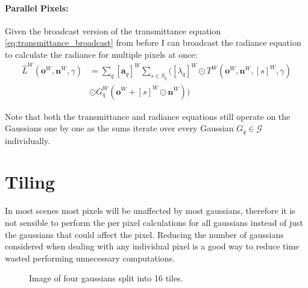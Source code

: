 \documentclass[a4paper, 11pt]{memoir}
\begin{document}
    \paragraph{Parallel Pixels:}
    \label{par:parallel_pixels}
    Given the broadcast version of the \gls{transmittance} equation \eqref{eq:transmittance_broadcast} from before I can broadcast the \gls{radiance} equation to
    calculate the \gls{radiance} for multiple pixels at once:
    \begin{equation}
        \begin{aligned}
            \hat{L}^W(\mathbf{o}^W, \mathbf{n}^W, \gamma) &= \sum_q [ \mathbf{a}_q ]^W \sum_{s \in S_q} \Big(
            [ \lambda_q ]^W \odot T^W(\mathbf{o}^W, \mathbf{n}^W, [ s ]^W, \gamma)\\
            &\odot G_q^W(\mathbf{o}^W + [ s ]^W \odot \mathbf{n}^W) \Big)
        \end{aligned}
        \label{eq:radiance_parallel_pixels}
    \end{equation}

    Note that both the \gls{transmittance} and \gls{radiance} equations still operate on the Gaussians one by one as the
    sums iterate over every Gaussian $G_q \in \mathcal{G}$ individually.

    \section{Tiling}
    In most scenes most pixels will be unaffected by most gaussians, therefore it is not sensible to perform
    the per pixel calculations for all gaussians instead of just the gaussians that could affect the pixel.
    Reducing the number of gaussians considered when dealing with any individual pixel is a good way to reduce
    time wasted performing unnecessary computations.

    \begin{figure}[H]
        \centering
        \caption{Image of four gaussians split into 16 tiles.}
        \label{fig:tiling}
    \end{figure}
\end{document}
